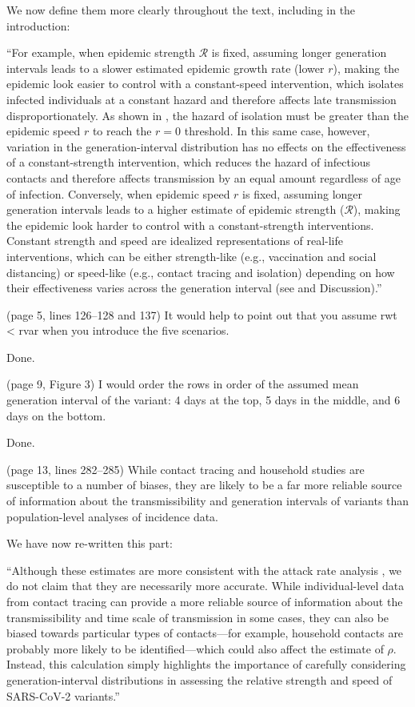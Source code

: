 \documentclass[12pt]{article}
\newcommand{\RR}{\ensuremath{{\mathcal R}}\xspace}
\newcommand{\revtext}{\textsf}
\begin{document}
We now define them more clearly throughout the text, including in the introduction:

``For example, when epidemic strength $\RR$ is fixed, assuming longer generation intervals leads to a slower estimated epidemic growth rate (lower $r$), making the epidemic look easier to control with a constant-speed intervention, which isolates infected individuals at a constant hazard and therefore affects late transmission disproportionately.
As shown in \cite{doi:10.1098/rspb.2020.1556}, the hazard of isolation must be greater than the epidemic speed $r$ to reach the $r=0$ threshold.
In this same case, however, variation in the generation-interval distribution has no effects on the effectiveness of a constant-strength intervention, which reduces the hazard of infectious contacts and therefore affects transmission by an equal amount regardless of age of infection.
Conversely, when epidemic speed $r$ is fixed, assuming longer generation intervals leads to a higher estimate of epidemic strength ($\RR$), making the epidemic look harder to control with a constant-strength interventions.
Constant strength and speed are idealized representations of real-life interventions, which can be either strength-like (e.g., vaccination and social distancing) or speed-like (e.g., contact tracing and isolation) depending on how their effectiveness varies across the generation interval (see \cite{doi:10.1098/rspb.2020.1556} and Discussion).''

\revtext{(page 5, lines 126–128 and 137) It would help to point out that you assume
rwt < rvar when you introduce the five scenarios.}

Done.

\revtext{(page 9, Figure 3) I would order the rows in order of the assumed mean
generation interval of the variant: 4 days at the top, 5 days in the middle,
and 6 days on the bottom.}

Done.

\revtext{(page 13, lines 282–285) While contact tracing and household studies are
susceptible to a number of biases, they are likely to be a far more reliable
source of information about the transmissibility and generation intervals
of variants than population-level analyses of incidence data.}

We have now re-written this part:

``Although these estimates are more consistent with the attack rate analysis \citep{ukinvest},
we do not claim that they are necessarily more accurate.
While individual-level data from contact tracing can provide a more reliable source of information about the transmissibility and time scale of transmission in some cases, they can also be biased towards particular types of contacts---for example, household contacts are probably more likely to be identified---which could also affect the estimate of $\rho$.
Instead, this calculation simply highlights the importance of carefully considering generation-interval distributions in assessing the relative strength and speed of SARS-CoV-2 variants.''
\end{document}
